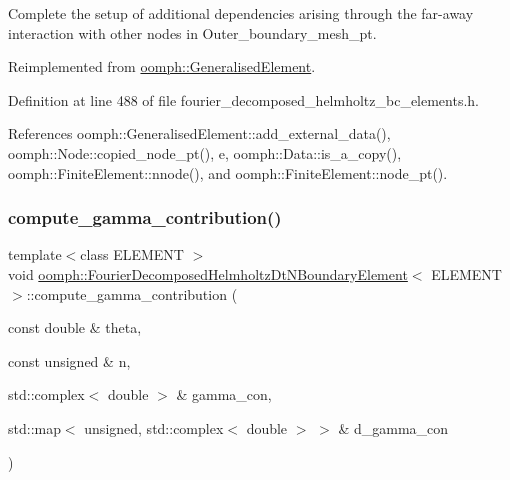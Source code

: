 Complete the setup of additional dependencies arising through the far-\/away interaction with other nodes in Outer\+\_\+boundary\+\_\+mesh\+\_\+pt. 



Reimplemented from \hyperlink{classoomph_1_1GeneralisedElement_af03c43b9df873659a6ca91e39566256e}{oomph\+::\+Generalised\+Element}.



Definition at line 488 of file fourier\+\_\+decomposed\+\_\+helmholtz\+\_\+bc\+\_\+elements.\+h.



References oomph\+::\+Generalised\+Element\+::add\+\_\+external\+\_\+data(), oomph\+::\+Node\+::copied\+\_\+node\+\_\+pt(), e, oomph\+::\+Data\+::is\+\_\+a\+\_\+copy(), oomph\+::\+Finite\+Element\+::nnode(), and oomph\+::\+Finite\+Element\+::node\+\_\+pt().

\mbox{\label{classoomph_1_1FourierDecomposedHelmholtzDtNBoundaryElement_aeabcecba445cac4bc31ef5133f87ce08}} 
\subsubsection{\texorpdfstring{compute\+\_\+gamma\+\_\+contribution()}{compute\_gamma\_contribution()}}
{\footnotesize\ttfamily template$<$class E\+L\+E\+M\+E\+NT $>$ \\
void \hyperlink{classoomph_1_1FourierDecomposedHelmholtzDtNBoundaryElement}{oomph\+::\+Fourier\+Decomposed\+Helmholtz\+Dt\+N\+Boundary\+Element}$<$ E\+L\+E\+M\+E\+NT $>$\+::compute\+\_\+gamma\+\_\+contribution (\begin{DoxyParamCaption}\item[{const double \&}]{theta,  }\item[{const unsigned \&}]{n,  }\item[{std\+::complex$<$ double $>$ \&}]{gamma\+\_\+con,  }\item[{std\+::map$<$ unsigned, std\+::complex$<$ double $>$ $>$ \&}]{d\+\_\+gamma\+\_\+con }\end{DoxyParamCaption})}




